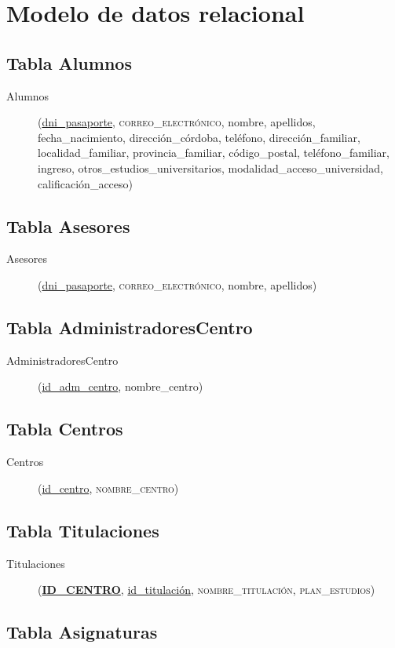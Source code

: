 \section{Modelo de datos relacional}

   \subsection{Tabla Alumnos}

      \begin{description}
         \item[Alumnos] (\underline{dni\_pasaporte},
         \textsc{correo\_electrónico}, nombre, apellidos, fecha\_nacimiento,
         dirección\_córdoba, teléfono, dirección\_familiar, localidad\_familiar,
         provincia\_familiar, código\_postal, teléfono\_familiar, ingreso,
         otros\_estudios\_universitarios, modalidad\_acceso\_universidad,
         calificación\_acceso)
      \end{description}

   \subsection{Tabla Asesores}

      \begin{description}
         \item[Asesores] (\underline{dni\_pasaporte},
         \textsc{correo\_electrónico}, nombre, apellidos)
      \end{description}

   \subsection{Tabla AdministradoresCentro}

      \begin{description}
         \item[AdministradoresCentro] (\underline{id\_adm\_centro},
         nombre\_centro)
      \end{description}

   \subsection{Tabla Centros}

      \begin{description}
         \item[Centros] (\underline{id\_centro},
         \textsc{nombre\_centro})
      \end{description}

   \subsection{Tabla Titulaciones}

      \begin{description}
         \item[Titulaciones] (\underline{\textbf{ID\_CENTRO}},
         \underline{id\_titulación}, \textsc{nombre\_titulación},
         \textsc{plan\_estudios})
      \end{description}

   \subsection{Tabla Asignaturas}

